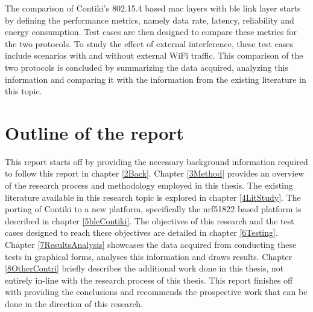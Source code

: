 The comparison of Contiki's 802.15.4 based \gls{mac} layers with \gls{ble} link layer starts by defining the performance metrics, namely data rate, latency, reliability and energy consumption. Test cases are then designed to compare these metrics for the two protocols. To study the effect of external interference, these test cases include scenarios with and without external WiFi traffic. This comparison of the two protocols is concluded by summarizing the data acquired, analyzing this information and comparing it with the information from the existing literature in this topic.



\section{Outline of the report}

This report starts off by providing the necessary background information required to follow this report in chapter \ref{2Back}. Chapter \ref{3Method} provides an overview of the research process and methodology employed in this thesis. The existing literature available in this research topic is explored in chapter \ref{4LitStudy}. The porting of Contiki to a new platform, specifically the nrf51822 based platform is described in chapter \ref{5bleContiki}. The objectives of this research and the test cases designed to reach these objectives are detailed in chapter \ref{6Testing}. Chapter \ref{7ResultsAnalysis} showcases the data acquired from conducting these tests in graphical forms, analyses this information and draws results. Chapter \ref{8OtherContri} briefly describes the additional work done in this thesis, not entirely in-line with the research process of this thesis. This report finishes off with providing the conclusions and recommends the prospective work that can be done in the direction of this research.


